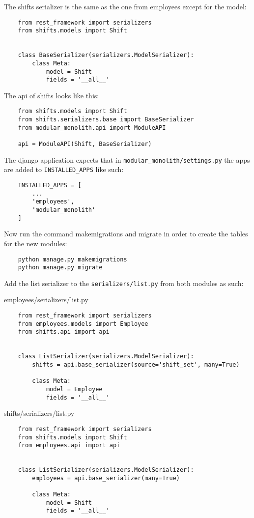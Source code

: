The shifts serializer is the same as the one from employees except for the model:
\begin{verbatim}
    from rest_framework import serializers
    from shifts.models import Shift


    class BaseSerializer(serializers.ModelSerializer):
        class Meta:
            model = Shift
            fields = '__all__'
\end{verbatim}

The api of shifts looks like this:
\begin{verbatim}
    from shifts.models import Shift
    from shifts.serializers.base import BaseSerializer
    from modular_monolith.api import ModuleAPI

    api = ModuleAPI(Shift, BaseSerializer)
\end{verbatim}

The django application expects that in \texttt{modular\_monolith/settings.py} the apps are added to \texttt{INSTALLED\_APPS} like such:
\begin{verbatim}
    INSTALLED_APPS = [
        ...
        'employees',
        'modular_monolith'
    ]
\end{verbatim}

Now run the command makemigrations and migrate in order to create the tables for the new modules:
\begin{verbatim}
    python manage.py makemigrations
    python manage.py migrate
\end{verbatim}

Add the list serializer to the \texttt{serializers/list.py} from both modules as such:

employees/serializers/list.py
\begin{verbatim}
    from rest_framework import serializers
    from employees.models import Employee
    from shifts.api import api
    
    
    class ListSerializer(serializers.ModelSerializer):
        shifts = api.base_serializer(source='shift_set', many=True)
    
        class Meta:
            model = Employee
            fields = '__all__'
\end{verbatim}

shifts/serializers/list.py
\begin{verbatim}
    from rest_framework import serializers
    from shifts.models import Shift
    from employees.api import api
    
    
    class ListSerializer(serializers.ModelSerializer):
        employees = api.base_serializer(many=True)
    
        class Meta:
            model = Shift
            fields = '__all__'  
\end{verbatim}

